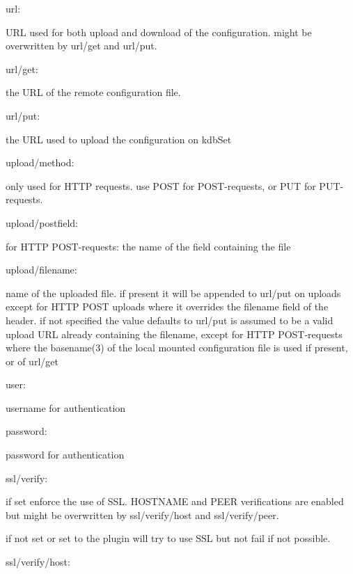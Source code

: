 \begin{DoxyItemize}
\item {\ttfamily url}\+:

{\ttfamily U\+RL} used for both upload and download of the configuration. might be overwritten by {\ttfamily url/get} and {\ttfamily url/put}.
\item {\ttfamily url/get}\+:

the {\ttfamily U\+RL} of the remote configuration file.
\item {\ttfamily url/put}\+:

the {\ttfamily U\+RL} used to upload the configuration on kdb\+Set
\item {\ttfamily upload/method}\+:

only used for {\ttfamily H\+T\+TP} requests. use {\ttfamily P\+O\+ST} for {\ttfamily P\+O\+ST}-\/requests, or {\ttfamily P\+UT} for {\ttfamily P\+UT}-\/requests.
\item {\ttfamily upload/postfield}\+:

for {\ttfamily H\+T\+TP P\+O\+ST}-\/requests\+: the name of the field containing the file
\item {\ttfamily upload/filename}\+:

name of the uploaded file. if present it will be appended to {\ttfamily url/put} on uploads except for {\ttfamily H\+T\+TP P\+O\+ST} uploads where it overrides the {\ttfamily filename} field of the header. if not specified the value defaults to {\ttfamily url/put} is assumed to be a valid upload {\ttfamily U\+RL} already containing the filename, except for {\ttfamily H\+T\+TP P\+O\+ST}-\/requests where the {\ttfamily basename(3)} of the local mounted configuration file is used if present, or of {\ttfamily url/get}
\item {\ttfamily user}\+:

username for authentication
\item {\ttfamily password}\+:

password for authentication
\item {\ttfamily ssl/verify}\+:

if set {} enforce the use of {\ttfamily S\+SL}. {\ttfamily H\+O\+S\+T\+N\+A\+ME} and {\ttfamily P\+E\+ER} verifications are enabled but might be overwritten by {\ttfamily ssl/verify/host} and {\ttfamily ssl/verify/peer}.

if not set or set to {} the plugin will try to use {\ttfamily S\+SL} but not fail if not possible.
\item {\ttfamily ssl/verify/host}\+:


\end{DoxyItemize}
